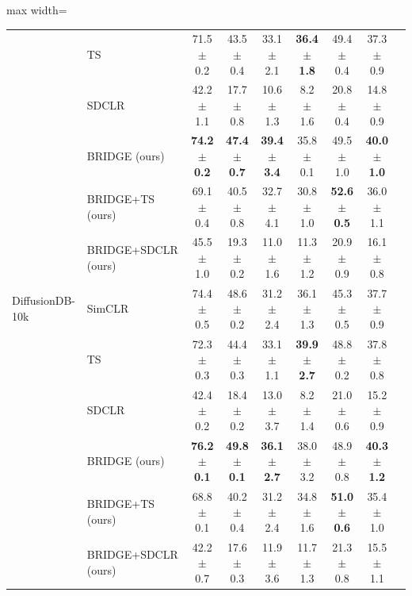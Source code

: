 \begin{table}[t]
\begin{adjustbox}{max width=\textwidth}
\begin{tabular}{l l c c c c c c c}
 & TS & 71.5 {\scriptsize$\pm$ 0.2} & 43.5 {\scriptsize$\pm$ 0.4} & 33.1 {\scriptsize$\pm$ 2.1} & \textbf{36.4 {\scriptsize$\pm$ 1.8}} & 49.4 {\scriptsize$\pm$ 0.4} & 37.3 {\scriptsize$\pm$ 0.9} \\
 & SDCLR & 42.2 {\scriptsize$\pm$ 1.1} & 17.7 {\scriptsize$\pm$ 0.8} & 10.6 {\scriptsize$\pm$ 1.3} & 8.2 {\scriptsize$\pm$ 1.6} & 20.8 {\scriptsize$\pm$ 0.4} & 14.8 {\scriptsize$\pm$ 0.9} \\
 & BRIDGE (ours) & \textbf{74.2 {\scriptsize$\pm$ 0.2}} & \textbf{47.4 {\scriptsize$\pm$ 0.7}} & \textbf{39.4 {\scriptsize$\pm$ 3.4}} & 35.8 {\scriptsize$\pm$ 0.1} & 49.5 {\scriptsize$\pm$ 1.0} & \textbf{40.0 {\scriptsize$\pm$ 1.0}} \\
 & BRIDGE+TS (ours) & 69.1 {\scriptsize$\pm$ 0.4} & 40.5 {\scriptsize$\pm$ 0.8} & 32.7 {\scriptsize$\pm$ 4.1} & 30.8 {\scriptsize$\pm$ 1.0} & \textbf{52.6 {\scriptsize$\pm$ 0.5}} & 36.0 {\scriptsize$\pm$ 1.1} \\
 & BRIDGE+SDCLR (ours) & 45.5 {\scriptsize$\pm$ 1.0} & 19.3 {\scriptsize$\pm$ 0.2} & 11.0 {\scriptsize$\pm$ 1.6} & 11.3 {\scriptsize$\pm$ 1.2} & 20.9 {\scriptsize$\pm$ 0.9} & 16.1 {\scriptsize$\pm$ 0.8} \\
\midrule
DiffusionDB-10k & SimCLR & 74.4 {\scriptsize$\pm$ 0.5} & 48.6 {\scriptsize$\pm$ 0.2} & 31.2 {\scriptsize$\pm$ 2.4} & 36.1 {\scriptsize$\pm$ 1.3} & 45.3 {\scriptsize$\pm$ 0.5} & 37.7 {\scriptsize$\pm$ 0.9} \\
 & TS & 72.3 {\scriptsize$\pm$ 0.3} & 44.4 {\scriptsize$\pm$ 0.3} & 33.1 {\scriptsize$\pm$ 1.1} & \textbf{39.9 {\scriptsize$\pm$ 2.7}} & 48.8 {\scriptsize$\pm$ 0.2} & 37.8 {\scriptsize$\pm$ 0.8} \\
 & SDCLR & 42.4 {\scriptsize$\pm$ 0.2} & 18.4 {\scriptsize$\pm$ 0.2} & 13.0 {\scriptsize$\pm$ 3.7} & 8.2 {\scriptsize$\pm$ 1.4} & 21.0 {\scriptsize$\pm$ 0.6} & 15.2 {\scriptsize$\pm$ 0.9} \\
 & BRIDGE (ours) & \textbf{76.2 {\scriptsize$\pm$ 0.1}} & \textbf{49.8 {\scriptsize$\pm$ 0.1}} & \textbf{36.1 {\scriptsize$\pm$ 2.7}} & 38.0 {\scriptsize$\pm$ 3.2} & 48.9 {\scriptsize$\pm$ 0.8} & \textbf{40.3 {\scriptsize$\pm$ 1.2}} \\
 & BRIDGE+TS (ours) & 68.8 {\scriptsize$\pm$ 0.1} & 40.2 {\scriptsize$\pm$ 0.4} & 31.2 {\scriptsize$\pm$ 2.4} & 34.8 {\scriptsize$\pm$ 1.6} & \textbf{51.0 {\scriptsize$\pm$ 0.6}} & 35.4 {\scriptsize$\pm$ 1.0} \\
 & BRIDGE+SDCLR (ours) & 42.2 {\scriptsize$\pm$ 0.7} & 17.6 {\scriptsize$\pm$ 0.3} & 11.9 {\scriptsize$\pm$ 3.6} & 11.7 {\scriptsize$\pm$ 1.3} & 21.3 {\scriptsize$\pm$ 0.8} & 15.5 {\scriptsize$\pm$ 1.1} \\
\bottomrule
\end{tabular}
\end{adjustbox}
\end{table}
